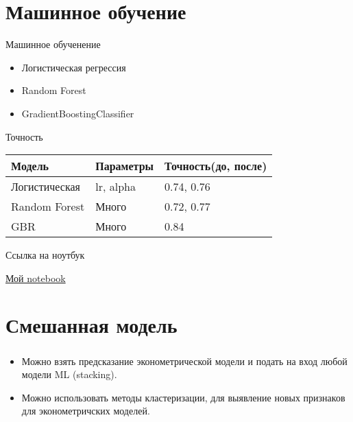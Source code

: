 \documentclass[unicode]{beamer}
\begin{document}
\section{Машинное обучение}
\begin{frame}{Машинное обученение}
	\begin{itemize}
		\Large
		\item  Логистическая регрессия
		
		\item  Random Forest
		
		\item GradientBoostingClassifier
	\end{itemize}
	
\end{frame}
\begin{frame}{Точность}
	\centering
	\Large
	\begin{tabular}{ | l | l | l | }
		\hline
		Модель & Параметры & Точность(до, после) \\ \hline
		Логистическая  & lr, alpha & 0.74, 0.76 \\
		Random Forest &  Много & 0.72, 0.77\\
		GBR &  Много & 0.84 \\
		\hline
	\end{tabular}


	
\end{frame}

\begin{frame}{Ссылка на ноутбук}
	
	\href{https://github.com/Harrix/Math-Harrix-Library}{Мой notebook}
	
\end{frame}
\section{Смешанная модель}

\begin{frame}
	\frametitle{\insertsection}
		\begin{itemize}
			\item Можно взять предсказание эконометрической модели и подать на вход любой модели ML (stacking).
			
			\item Можно использовать методы кластеризации, для выявление новых признаков для эконометричских моделей.
		\end{itemize}
\end{frame}	
	
\end{document}
